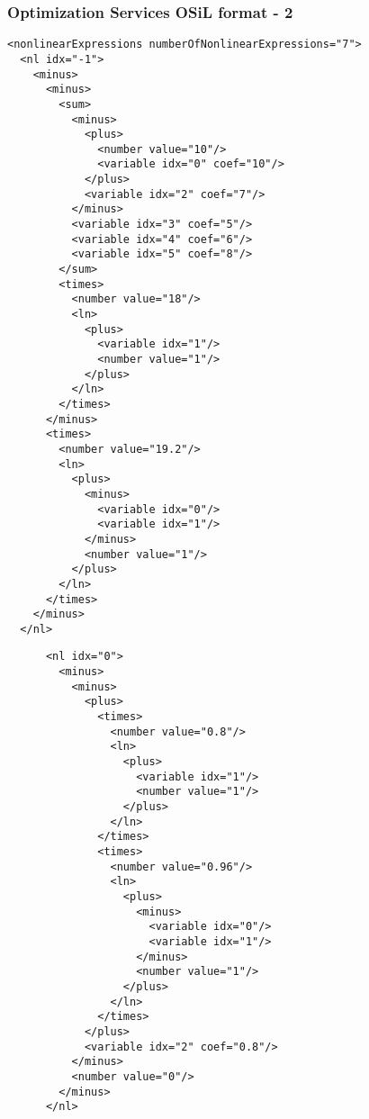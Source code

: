 \documentclass[compressed,dvips,letter]{beamer}
\begin{document}
\begin{frame}[fragile]\frametitle{Optimization Services OSiL format - 2}
\begin{minipage}{0.54\textwidth}
{\fontsize{6pt}{0} \selectfont
\begin{verbatim}
<nonlinearExpressions numberOfNonlinearExpressions="7">
  <nl idx="-1">
    <minus>
      <minus>
        <sum>
          <minus>
            <plus>
              <number value="10"/>
              <variable idx="0" coef="10"/>
            </plus>
            <variable idx="2" coef="7"/>
          </minus>
          <variable idx="3" coef="5"/>
          <variable idx="4" coef="6"/>
          <variable idx="5" coef="8"/>
        </sum>
        <times>
          <number value="18"/>
          <ln>
            <plus>
              <variable idx="1"/>
              <number value="1"/>
            </plus>
          </ln>
        </times>
      </minus>
      <times>
        <number value="19.2"/>
        <ln>
          <plus>
            <minus>
              <variable idx="0"/>
              <variable idx="1"/>
            </minus>
            <number value="1"/>
          </plus>
        </ln>
      </times>
    </minus>
  </nl>
\end{verbatim}
}
\end{minipage}
\begin{minipage}{0.42\textwidth}
{\fontsize{6pt}{0} \selectfont
\begin{verbatim}
      <nl idx="0">
        <minus>
          <minus>
            <plus>
              <times>
                <number value="0.8"/>
                <ln>
                  <plus>
                    <variable idx="1"/>
                    <number value="1"/>
                  </plus>
                </ln>
              </times>
              <times>
                <number value="0.96"/>
                <ln>
                  <plus>
                    <minus>
                      <variable idx="0"/>
                      <variable idx="1"/>
                    </minus>
                    <number value="1"/>
                  </plus>
                </ln>
              </times>
            </plus>
            <variable idx="2" coef="0.8"/>
          </minus>
          <number value="0"/>
        </minus>
      </nl>
\end{verbatim}
}
\end{minipage}
\end{frame}
%
%
\end{document}
